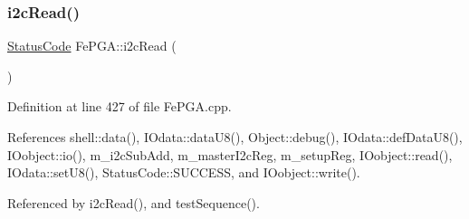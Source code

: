 \subsubsection{\texorpdfstring{i2c\+Read()}{i2cRead()}\hspace{0.1cm}{\footnotesize\ttfamily [1/2]}}
{\footnotesize\ttfamily \hyperlink{classStatusCode}{Status\+Code} Fe\+P\+G\+A\+::i2c\+Read (\begin{DoxyParamCaption}{ }\end{DoxyParamCaption})}



Definition at line 427 of file Fe\+P\+G\+A.\+cpp.



References shell\+::data(), I\+Odata\+::data\+U8(), Object\+::debug(), I\+Odata\+::def\+Data\+U8(), I\+Oobject\+::io(), m\+\_\+i2c\+Sub\+Add, m\+\_\+master\+I2c\+Reg, m\+\_\+setup\+Reg, I\+Oobject\+::read(), I\+Odata\+::set\+U8(), Status\+Code\+::\+S\+U\+C\+C\+E\+SS, and I\+Oobject\+::write().



Referenced by i2c\+Read(), and test\+Sequence().


